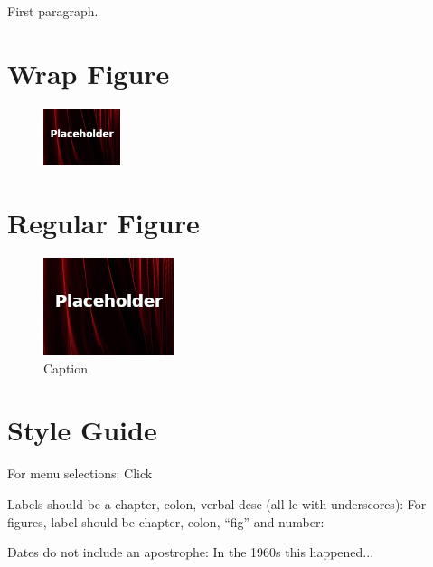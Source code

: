 First paragraph.

\section{Wrap Figure}
\begin{figure}
	\caption{} %
	\label{03:fig01} 
	\centering
	\includegraphics[width=0.2\textwidth]{gfx/99-placeholder} 
\end{figure}

\section{Regular Figure}
\begin{figure}[H]
	\centering
	\includegraphics[width=\maxwidth{.95\linewidth}]{gfx/99-placeholder}
	\caption{Caption}
	\label{03:fig01}
\end{figure}

\section{Style Guide}

For menu selections:
Click \textsc{}

Labels should be a chapter, colon, verbal desc (all lc with underscores): \label{03:title}
For figures, label should be chapter, colon, ``fig'' and number: \label{03:fig01}

Dates do not include an apostrophe: In the 1960s this happened...

